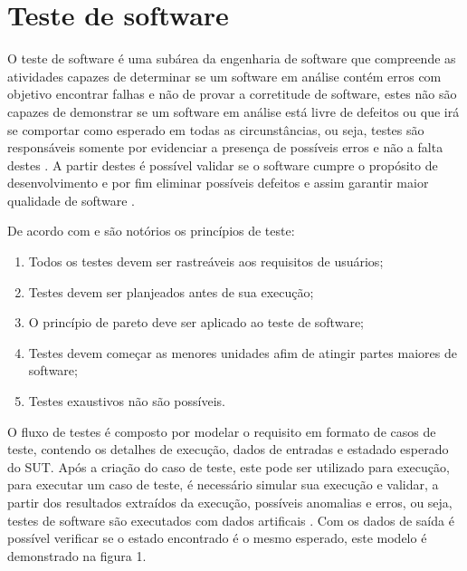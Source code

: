 \documentclass[
	12pt,				%
	oneside,			%
	a4paper,			%
	english,			%
	brazil				%
	]{abntex2ppgsi}
\begin{document}
\section{Teste de software}
O teste de software é uma subárea da engenharia de software que compreende as atividades capazes de determinar se um software em análise contém erros \cite{gerhart1975} com objetivo encontrar falhas e não de provar a corretitude de software, estes não são capazes de demonstrar se um software em análise está livre de defeitos ou que irá se comportar como esperado em todas as circunstâncias, ou seja, testes são responsáveis somente por evidenciar a presença de possíveis erros e não a falta destes \cite{pfleeger2010}. A partir destes é possível validar se o software cumpre o propósito de desenvolvimento e por fim eliminar possíveis defeitos e assim garantir maior qualidade de software \cite{Sommerville2010}. 

De acordo com \cite{pressman2009engenharia} e \cite{Davis1995} são notórios os princípios de teste: 

\begin{enumerate}
\item Todos os testes devem ser rastreáveis aos requisitos de usuários;
\item Testes devem ser planjeados antes de sua execução;
\item O princípio de pareto deve ser aplicado ao teste de software;
\item Testes devem começar as menores unidades afim de atingir partes maiores de software;
\item Testes exaustivos não são possíveis.
\end{enumerate}


O fluxo de testes  é composto por modelar o requisito em formato de casos de teste,
contendo os detalhes de execução, dados de entradas e estadado esperado do SUT. Após a criação do caso de teste, este pode ser utilizado para execução, para executar um caso de teste,  é necessário simular sua execução e validar, a partir dos resultados extraídos da execução, possíveis anomalias e erros, ou seja, testes de software são executados com dados artificais \cite{Sommerville2010}. Com os dados de saída  é possível verificar se o estado encontrado é o mesmo esperado, este modelo é demonstrado na figura 1.
\end{document}

